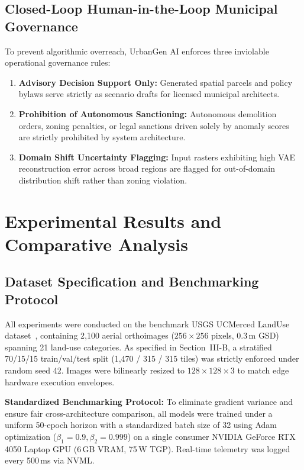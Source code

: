 \documentclass[journal]{IEEEtran}
\begin{document}
\subsection{Closed-Loop Human-in-the-Loop Municipal Governance}
To prevent algorithmic overreach, UrbanGen AI enforces three inviolable operational governance rules:
\begin{enumerate}
    \item \textbf{Advisory Decision Support Only:} Generated spatial parcels and policy bylaws serve strictly as scenario drafts for licensed municipal architects.
    \item \textbf{Prohibition of Autonomous Sanctioning:} Autonomous demolition orders, zoning penalties, or legal sanctions driven solely by anomaly scores are strictly prohibited by system architecture.
    \item \textbf{Domain Shift Uncertainty Flagging:} Input rasters exhibiting high VAE reconstruction error across broad regions are flagged for out-of-domain distribution shift rather than zoning violation.
\end{enumerate}

\section{Experimental Results and Comparative Analysis}

\subsection{Dataset Specification and Benchmarking Protocol}
All experiments were conducted on the benchmark USGS UCMerced LandUse dataset~\cite{yang2010bag}, containing 2,100 aerial orthoimages ($256 \times 256$ pixels, 0.3\,m GSD) spanning 21 land-use categories. As specified in Section~III-B, a stratified 70/15/15 train/val/test split (1,470 / 315 / 315 tiles) was strictly enforced under random seed 42. Images were bilinearly resized to $128 \times 128 \times 3$ to match edge hardware execution envelopes.

\noindent\textbf{Standardized Benchmarking Protocol:} To eliminate gradient variance and ensure fair cross-architecture comparison, all models were trained under a uniform 50-epoch horizon with a standardized batch size of 32 using Adam optimization ($\beta_1=0.9, \beta_2=0.999$) on a single consumer NVIDIA GeForce RTX 4050 Laptop GPU (6\,GB VRAM, 75\,W TGP). Real-time telemetry was logged every 500\,ms via NVML.
\end{document}
